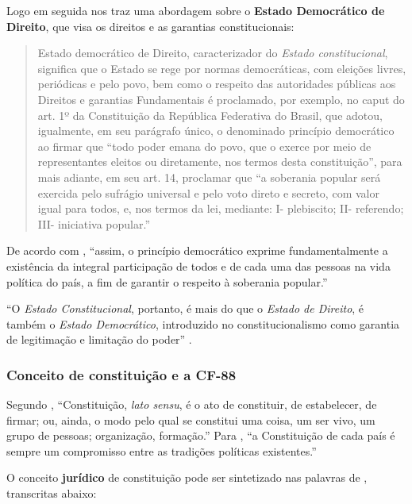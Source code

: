 \documentclass[]{article}
\begin{document}
Logo em seguida  nos traz uma abordagem sobre o
\textbf{Estado Democrático de Direito}, que visa os direitos e as
garantias constitucionais:

\begin{quote}
Estado democrático de Direito, caracterizador do \emph{Estado
constitucional}, significa que o Estado se rege por normas democráticas,
com eleições livres, periódicas e pelo povo, bem como o respeito das
autoridades públicas aos Direitos e garantias Fundamentais é proclamado,
por exemplo, no caput do art. 1º da Constituição da República Federativa
do Brasil, que adotou, igualmente, em seu parágrafo único, o denominado
princípio democrático ao firmar que ``todo poder emana do povo, que o
exerce por meio de representantes eleitos ou diretamente, nos termos
desta constituição'', para mais adiante, em seu art. 14, proclamar que
``a soberania popular será exercida pelo sufrágio universal e pelo voto
direto e secreto, com valor igual para todos, e, nos termos da lei,
mediante: I- plebiscito; II- referendo; III- iniciativa popular.''
\end{quote}

De acordo com , ``assim, o princípio
democrático exprime fundamentalmente a existência da integral
participação de todos e de cada uma das pessoas na vida política do
país, a fim de garantir o respeito à soberania popular.''

``O \emph{Estado Constitucional}, portanto, é mais do que o \emph{Estado
de Direito}, é também o \emph{Estado Democrático}, introduzido no
constitucionalismo como garantia de legitimação e limitação do poder''
\cite[p.~6]{moraes}.

\subsubsection{Conceito de constituição e a
CF-88}\label{conceito-de-constituicao-e-a-cf-88}

Segundo , ``Constituição, \emph{lato sensu}, é
o ato de constituir, de estabelecer, de firmar; ou, ainda, o modo pelo
qual se constitui uma coisa, um ser vivo, um grupo de pessoas;
organização, formação.'' Para ,
``a Constituição de cada país é sempre um compromisso entre as tradições
políticas existentes.''

O conceito \textbf{jurídico} de constituição pode ser sintetizado nas
palavras de , transcritas abaixo:
\end{document}
